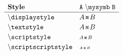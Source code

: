 \documentclass[varwidth, border = 3pt]{standalone}
\newcommand{\test}%
           {A \mysymb B}
\newcommand{\verbtest}%
           {A \mathmacro{mysymb} B}
\newcommand{\testmathstyle}{
  \[
    \renewcommand{\arraystretch}{1.2}%
    \begin{array}{lll}
        \textbf{Style}
      & \mathtt{\verbtest}
      \\ \hline
        \mathtt{\backslash displaystyle}
      & \displaystyle \test
      \\
        \mathtt{\backslash textstyle}
      & \textstyle \test
      \\
        \mathtt{\backslash scriptstyle}
      & \scriptstyle \test
      \\
        \mathtt{\backslash scriptscriptstyle}
      & \scriptscriptstyle \test
    \end{array}
  \]
}
\begin{document}
\testmathstyle
\end{document}
